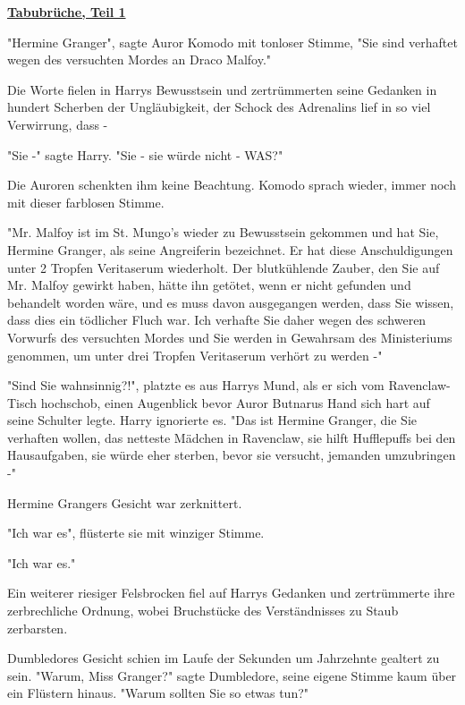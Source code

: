 

\hypertarget{tabubruxfcche-teil-1}{%

\textbf{\uline{Tabubrüche, Teil 1}}

"Hermine Granger", sagte Auror Komodo mit tonloser Stimme, "Sie sind verhaftet wegen des versuchten Mordes an Draco Malfoy."

Die Worte fielen in Harrys Bewusstsein und zertrümmerten seine Gedanken in hundert Scherben der Ungläubigkeit, der Schock des Adrenalins lief in so viel Verwirrung, dass -

"Sie -" sagte Harry. "Sie - sie würde nicht - WAS?"

Die Auroren schenkten ihm keine Beachtung. Komodo sprach wieder, immer noch mit dieser farblosen Stimme.

"Mr. Malfoy ist im St. Mungo's wieder zu Bewusstsein gekommen und hat Sie, Hermine Granger, als seine Angreiferin bezeichnet. Er hat diese Anschuldigungen unter 2 Tropfen Veritaserum wiederholt. Der blutkühlende Zauber, den Sie auf Mr. Malfoy gewirkt haben, hätte ihn getötet, wenn er nicht gefunden und behandelt worden wäre, und es muss davon ausgegangen werden, dass Sie wissen, dass dies ein tödlicher Fluch war. Ich verhafte Sie daher wegen des schweren Vorwurfs des versuchten Mordes und Sie werden in Gewahrsam des Ministeriums genommen, um unter drei Tropfen Veritaserum verhört zu werden -"

"Sind Sie wahnsinnig?!", platzte es aus Harrys Mund, als er sich vom Ravenclaw-Tisch hochschob, einen Augenblick bevor Auror Butnarus Hand sich hart auf seine Schulter legte. Harry ignorierte es. "Das ist Hermine Granger, die Sie verhaften wollen, das netteste Mädchen in Ravenclaw, sie hilft Hufflepuffs bei den Hausaufgaben, sie würde eher sterben, bevor sie versucht, jemanden umzubringen -"

Hermine Grangers Gesicht war zerknittert.

"Ich war es", flüsterte sie mit winziger Stimme.

"Ich war es."

Ein weiterer riesiger Felsbrocken fiel auf Harrys Gedanken und zertrümmerte ihre zerbrechliche Ordnung, wobei Bruchstücke des Verständnisses zu Staub zerbarsten.

Dumbledores Gesicht schien im Laufe der Sekunden um Jahrzehnte gealtert zu sein. "Warum, Miss Granger?" sagte Dumbledore, seine eigene Stimme kaum über ein Flüstern hinaus. "Warum sollten Sie so etwas tun?"

}
